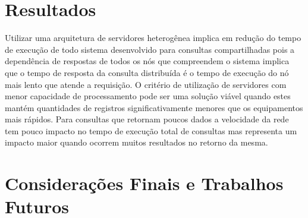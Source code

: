 \documentclass[12pt, a4paper]{article}
\begin{document}
\section{Resultados}


Utilizar uma arquitetura de servidores heterogênea implica em redução do tempo de execução de todo
sistema desenvolvido para consultas compartilhadas pois a dependência de respostas de todos os
nós que compreendem o sistema implica que o tempo de resposta da consulta distribuída é o tempo
de execução do nó mais lento que atende a requisição. O critério de utilização de servidores 
com menor capacidade de processamento pode ser uma solução viável quando estes mantém quantidades
de registros significativamente menores que os equipamentos mais rápidos. Para consultas que
retornam poucos dados a velocidade da rede tem pouco impacto no tempo de execução total de
consultas mas representa um impacto maior quando ocorrem muitos resultados no retorno da mesma.

\section{Considerações Finais e Trabalhos Futuros}

{}
\end{document}
